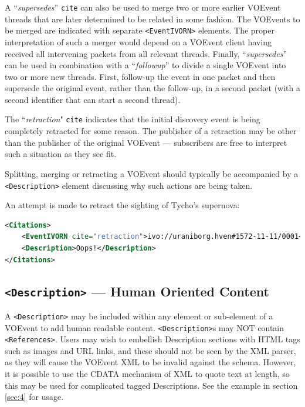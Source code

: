 \documentclass[11pt,a4paper]{ivoa}
\begin{document}
A ``\emph{supersedes}'' {\tt cite} can also be used to merge two or more earlier
VOEvent threads that are later determined to be related in some fashion. The 
VOEvents to be merged are indicated with separate {\tt <EventIVORN>} elements. 
The proper interpretation of such a merger would depend on a VOEvent client 
having received all intervening packets from all relevant threads. Finally, 
``\emph{supersedes}'' can be used in combination with a ``\emph{followup}'' to 
divide a single VOEvent into two or more new threads. First, follow-up the event
in one packet and then supersede the original event, rather than the follow-up,
in a second packet (with a second identifier that can start a second thread). 

The ``\emph{retraction}" {\tt cite} indicates that the initial discovery event 
is being completely retracted for some reason. The publisher of a retraction may
be other than the publisher of the original VOEvent --- subscribers are free to
interpret such a situation as they see fit. 

Splitting, merging or retracting a VOEvent should typically be accompanied by a
{\tt <Description>} element discussing why such actions are being taken. 

An attempt is made to retract the sighting of Tycho's supernova: 
\begin{lstlisting}[language=XML]
<Citations>
    <EventIVORN cite="retraction">ivo://uraniborg.hven#1572-11-11/0001</EventIVORN>     
    <Description>Oops!</Description>
</Citations> 
\end{lstlisting}

\subsection{{\tt <Description>} --- Human Oriented Content}
\label{sec:3.8}
A {\tt <Description>} may be included within any element or sub-element of a
VOEvent to add human readable content. {\tt <Description>}s may NOT contain {\tt 
<References>}. Users may wish to embellish Description sections with HTML tags 
such as images and URL links, and these should not be seen by the XML parser, as
they will cause the VOEvent XML to be invalid against the schema. However, it is 
possible to use the CDATA mechanism of XML to quote text at length, so this may 
be used for complicated tagged Descriptions. See the example in section 
\ref{sec:4} for usage. 
\end{document}
